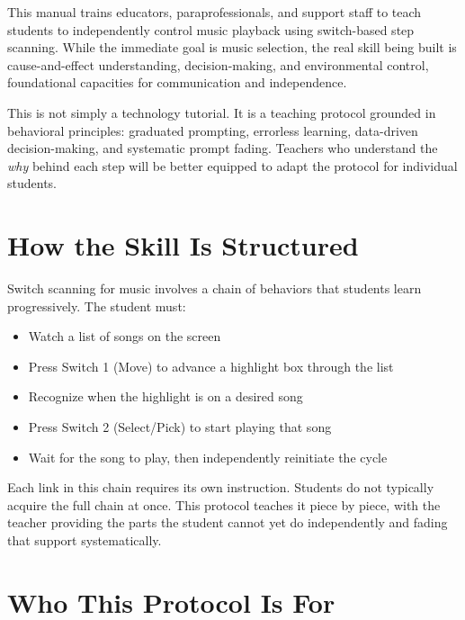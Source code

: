 \documentclass[justified,openright]{tufte-book}
\begin{document}
This manual trains educators, paraprofessionals, and support staff to
teach students to independently control music playback using
switch-based step scanning. While the immediate goal is music selection,
the real skill being built is cause-and-effect understanding,
decision-making, and environmental control, foundational capacities
for communication and independence.

This is not simply a technology tutorial. It is a teaching protocol
grounded in behavioral principles: graduated prompting, errorless
learning, data-driven decision-making, and systematic prompt fading.
Teachers who understand the \emph{why} behind each step will be better
equipped to adapt the protocol for individual students.

\section{How the Skill Is
Structured}\label{how-the-skill-is-structured}


Switch scanning for music involves a chain of behaviors that students
learn progressively. The student must:

\begin{itemize}

\item
  Watch a list of songs on the screen
\item
  Press Switch 1 (Move) to advance a highlight box through the list
\item
  Recognize when the highlight is on a desired song
\item
  Press Switch 2 (Select/Pick) to start playing that song
\item
  Wait for the song to play, then independently reinitiate the cycle
\end{itemize}

Each link in this chain requires its own instruction. Students do not
typically acquire the full chain at once. This protocol teaches it piece
by piece, with the teacher providing the parts the student cannot yet do
independently and fading that support systematically.

\section{Who This Protocol Is
For}\label{who-this-protocol-is-for}
\end{document}
